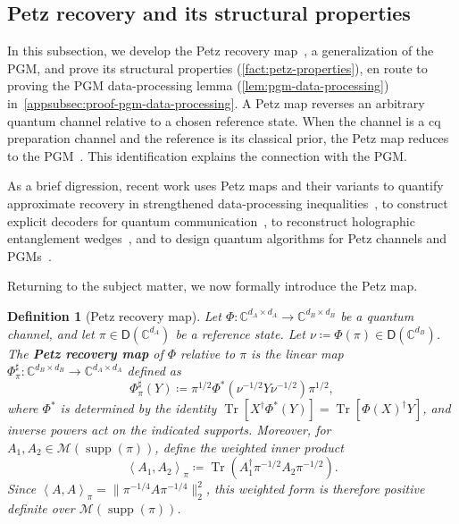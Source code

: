 \documentclass[11pt]{article}
\newtheorem{definition}{Definition}[section]
\theoremstyle{remark}
\newcommand{\cM}{\mathcal{M}}
\newcommand{\C}{\mathbb{C}}
\newcommand{\Tr}{\operatorname{Tr}}
\newcommand{\supp}{\operatorname{supp}}
\newcommand{\Dens}{\mathsf{D}}
\newcommand{\norm}[1]{\lVert#1\rVert}
\newcommand{\inner}[2]{\left\langle #1, #2\right\rangle}
\begin{document}
\subsection{Petz recovery and its structural properties}
\label{appsubsec:petz-recovery-properties}

In this subsection, we develop the Petz recovery map~\cite{Pet84,Pet86,Pet88,Ren22}, a generalization of the PGM, and prove its structural properties (\cref{fact:petz-properties}), en route to proving the PGM data-processing lemma (\cref{lem:pgm-data-processing}) in~\cref{appsubsec:proof-pgm-data-processing}. A Petz map reverses an arbitrary quantum channel relative to a chosen reference state. When the channel is a cq preparation channel and the reference is its classical prior, the Petz map reduces to the PGM~\cite{BK02}. This identification explains the connection with the PGM.

As a brief digression, recent work uses Petz maps and their variants to quantify approximate recovery in strengthened data-processing inequalities~\cite{STH16,JRSWW18}, to construct explicit decoders for quantum communication~\cite{BDL16}, to reconstruct holographic entanglement wedges~\cite{CPS20}, and to design quantum algorithms for Petz channels and PGMs~\cite{GLMQW22}.

Returning to the subject matter, we now formally introduce the Petz map.

\begin{definition}[Petz recovery map]
\label{def:petz-recovery}
Let $\Phi : \C^{d_A \times d_A} \to \C^{d_B \times d_B}$ be a quantum channel, and let $\pi \in \Dens(\C^{d_A})$ be a reference state. Let $\nu \coloneqq \Phi(\pi) \in \Dens(\C^{d_B})$. The \textbf{Petz recovery map} of $\Phi$ relative to $\pi$ is the linear map $\Phi_\pi^\sharp : \C^{d_B \times d_B} \to \C^{d_A \times d_A}$ defined as
\begin{equation*}
\Phi_\pi^\sharp(Y)
\coloneqq
\pi^{1/2}\Phi^*\left(\nu^{-1/2}Y\nu^{-1/2}\right)\pi^{1/2},
\end{equation*}
where $\Phi^*$ is determined by the identity $\Tr[X^\dagger\Phi^*(Y)] = \Tr[\Phi(X)^\dagger Y]$, and inverse powers act on the indicated supports. Moreover, for $A_1,A_2 \in \cM(\supp(\pi))$, define the weighted inner product
\begin{equation*}
\inner{A_1}{A_2}_\pi
\coloneqq
\Tr\left(A_1^\dagger\pi^{-1/2}A_2\pi^{-1/2}\right).
\end{equation*}
Since $\inner{A}{A}_\pi = \norm{\pi^{-1/4}A\pi^{-1/4}}_2^2$, this weighted form is therefore positive definite over $\cM(\supp(\pi))$.
\end{definition}
\end{document}
